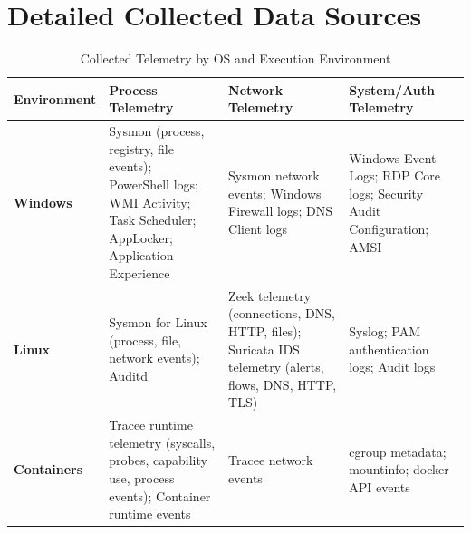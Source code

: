 
\section{Detailed Collected Data Sources}
\label{app:collect data sources}


\begin{table}[htbp]
\centering
\footnotesize
\caption{Collected Telemetry by OS and Execution Environment}
\label{tab:collected_data_os}
\small
\begin{tabular}{@{}p{2.5cm} p{4cm} p{4cm} p{4cm}@{}}
\toprule
\textbf{Environment} &
\textbf{Process Telemetry} &
\textbf{Network Telemetry} &
\textbf{System/Auth Telemetry} \\
\midrule

\textbf{Windows} & 
Sysmon (process, registry, file events); PowerShell logs; WMI Activity; Task Scheduler; AppLocker; Application Experience &
Sysmon network events; Windows Firewall logs; DNS Client logs &
Windows Event Logs; RDP Core logs; Security Audit Configuration; AMSI \footnotemark\\
\midrule

\textbf{Linux} &
Sysmon for Linux (process, file, network events); Auditd &
Zeek telemetry (connections, DNS, HTTP, files); Suricata IDS telemetry (alerts, flows, DNS, HTTP, TLS) &
Syslog; PAM authentication logs; Audit logs \\
\midrule

\textbf{Containers} &
Tracee runtime telemetry (syscalls, probes, capability use, process events); Container runtime events &
Tracee network events &
cgroup metadata; mountinfo; docker API events \\
\bottomrule
\end{tabular}
\end{table}



